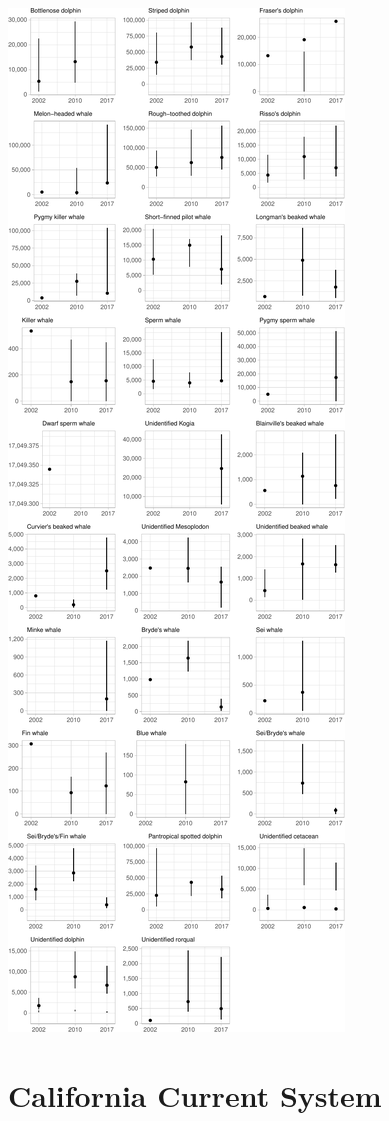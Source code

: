 \documentclass[
]{book}
\begin{document}
\includegraphics{figures/unnamed-chunk-353-1.pdf}

\hypertarget{california-current-system}{%
\chapter{California Current System}\label{california-current-system}}
\end{document}

